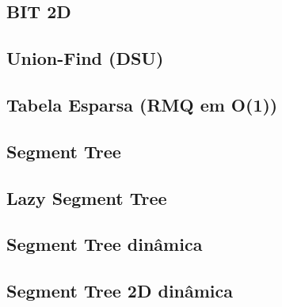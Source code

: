\subsection{BIT 2D}


\subsection{Union-Find (DSU)}


% 

\subsection{Tabela Esparsa (RMQ em O(1))}


\subsection{Segment Tree}


\subsection{Lazy Segment Tree}


\subsection{Segment Tree dinâmica}


\subsection{Segment Tree 2D dinâmica}


% 

% 


